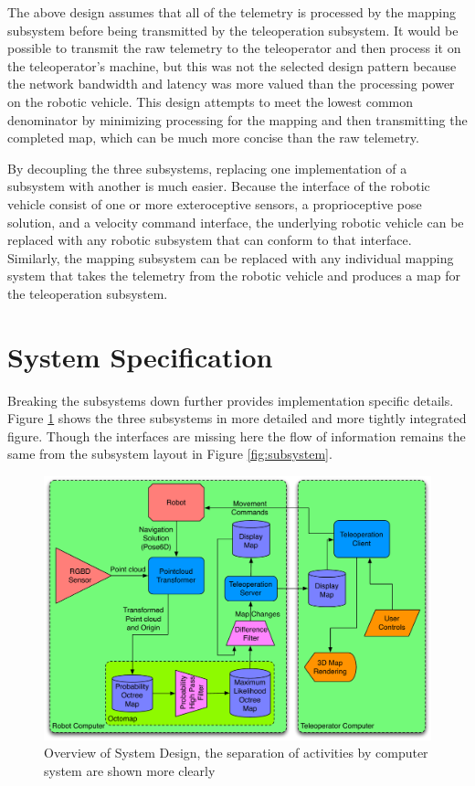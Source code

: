 \documentclass[12pt]{report}
\begin{document}
The above design assumes that all of the telemetry is processed by the mapping subsystem before being transmitted by the teleoperation subsystem.  It would be possible to transmit the raw telemetry to the teleoperator and then process it on the teleoperator's machine, but this was not the selected design pattern because the network bandwidth and latency was more valued than the processing power on the robotic vehicle.  This design attempts to meet the lowest common denominator by minimizing processing for the mapping and then transmitting the completed map, which can be much more concise than the raw telemetry.

By decoupling the three subsystems, replacing one implementation of a subsystem with another is much easier.  Because the interface of the robotic vehicle consist of one or more exteroceptive sensors, a proprioceptive pose solution, and a velocity command interface, the underlying robotic vehicle can be replaced with any robotic subsystem that can conform to that interface.  Similarly, the mapping subsystem can be replaced with any individual mapping system that takes the telemetry from the robotic vehicle and produces a map for the teleoperation subsystem.

\section{System Specification}
Breaking the subsystems down further provides implementation specific details.  Figure \ref{fig:system_diagram} shows the three subsystems in more detailed and more tightly integrated figure.  Though the interfaces are missing here the flow of information remains the same from the subsystem layout in Figure \ref{fig:subsystem}.

\begin{figure}[ht]
  \centering
  \includegraphics[width=6in,keepaspectratio]{system_diagram.pdf}
  \caption{Overview of System Design, the separation of activities by computer system are shown more clearly}
  \label{fig:system_diagram}
\end{figure}
\end{document}

